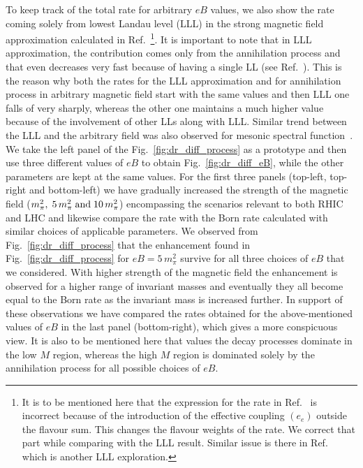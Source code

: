 \documentclass[aps,prd,floatfix,showpacs,showkeys,superscriptadress,unsortedaddress,nofootinbib,onecolumn]{revtex4-1}
\begin{document}
To keep track of the total rate for arbitrary $eB$ values, we also show the rate coming solely from lowest Landau level (LLL) in the strong magnetic field approximation calculated in Ref.~\cite{Bandyopadhyay:2016fyd}\footnote{It is to be mentioned here that the expression for the rate in Ref.~\cite{Bandyopadhyay:2016fyd} is incorrect because of the introduction of the effective coupling $(e_e)$ outside the flavour sum. This changes the flavour weights of the rate. We correct that part while comparing with the LLL result. Similar issue is there in Ref.~\cite{Islam:2018sog} which is another LLL exploration.}. It is important to note that in LLL approximation, the contribution comes only from the annihilation process and that even decreases very fast because of having a single LL (see Ref.~\cite{Bandyopadhyay:2016fyd}). This is the reason why both the rates for the LLL approximation and for annihilation process in arbitrary magnetic field start with the same values and then LLL one falls of very sharply, whereas the other one maintains a much higher value because of the involvement of other LLs along with LLL. Similar trend between the LLL and the arbitrary field was also observed for mesonic spectral function~\cite{Chakraborty:2017vvg}.\\

We take the left panel of the Fig.~\ref{fig:dr_diff_process} as a prototype and then use three different values of $eB$ to obtain Fig.~\ref{fig:dr_diff_eB}, while the other parameters are kept at the same values. For the first three panels (top-left, top-right and bottom-left) we have gradually increased the strength of the magnetic field ($m_\pi^2,\;5\,m_\pi^2\;{\rm and}\;10\,m_\pi^2$) encompassing the scenarios relevant to both RHIC and LHC and likewise compare the rate with the Born rate calculated with similar choices of applicable parameters. We observed from Fig.~\ref{fig:dr_diff_process} that the enhancement found in Fig.~\ref{fig:dr_diff_process} for $eB=5\,m_\pi^2$ survive for all three choices of $eB$ that we considered. With higher strength of the magnetic field the enhancement is observed for a higher range of invariant masses and eventually they all become equal to the Born rate as the invariant mass is increased further. In support of these observations we have compared the rates obtained for the above-mentioned values of $eB$ in the last panel (bottom-right), which gives a more conspicuous view. It is also to be mentioned here that values the decay processes dominate in the low $M$ region, whereas the high $M$ region is dominated solely by the annihilation process for all possible choices of $eB$.\\ 
\end{document}
